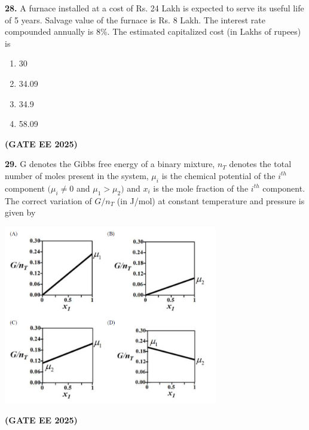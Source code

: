 \documentclass[journal,12pt,onecolumn]{IEEEtran}
\newcommand{\brak}[1]{(#1)}
\begin{document}
\noindent\textbf{28.} A furnace installed at a cost of Rs. 24 Lakh is expected to serve its useful life of 5 years. Salvage value of the furnace is Rs. 8 Lakh. The interest rate compounded annually is 8\%. The estimated capitalized cost \brak{in Lakhs of rupees} is
\begin{enumerate}
    \item 30
    \item 34.09
    \item 34.9
    \item 58.09
\end{enumerate}
\hfill \textbf{\brak{GATE EE 2025}}

\noindent\textbf{29.} G denotes the Gibbs free energy of a binary mixture, $n_T$ denotes the total number of moles present in the system, $\mu_{i}$ is the chemical potential of the $i^{th}$ component $\brak{\mu_{i}\ne0$ and $\mu_{1}>\mu_{2}}$ and $x_i$ is the mole fraction of the $i^{th}$ component. The correct variation of $G/n_{T}$ \brak{in J/mol} at constant temperature and pressure is given by
\begin{center}
\includegraphics[width=0.7\textwidth]{figs/29.png}
\end{center}
\hfill \textbf{\brak{GATE EE 2025}}
\end{document}

